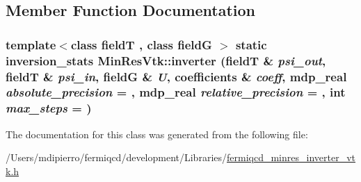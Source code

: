 \subsection{Member Function Documentation}
\hypertarget{class_min_res_vtk_aa64a387a3e60246d6a582e4e746f12e9}{
\subsubsection[{inverter}]{\setlength{\rightskip}{0pt plus 5cm}template$<$class fieldT , class fieldG $>$ static {\bf inversion\_\-stats} MinResVtk::inverter (fieldT \& {\em psi\_\-out}, \/  fieldT \& {\em psi\_\-in}, \/  fieldG \& {\em U}, \/  {\bf coefficients} \& {\em coeff}, \/  {\bf mdp\_\-real} {\em absolute\_\-precision} = {}, \/  {\bf mdp\_\-real} {\em relative\_\-precision} = {}, \/  int {\em max\_\-steps} = {})}}
\label{class_min_res_vtk_aa64a387a3e60246d6a582e4e746f12e9}


The documentation for this class was generated from the following file:\begin{DoxyCompactItemize}
\item 
/Users/mdipierro/fermiqcd/development/Libraries/\hyperlink{fermiqcd__minres__inverter__vtk_8h}{fermiqcd\_\-minres\_\-inverter\_\-vtk.h}\end{DoxyCompactItemize}
